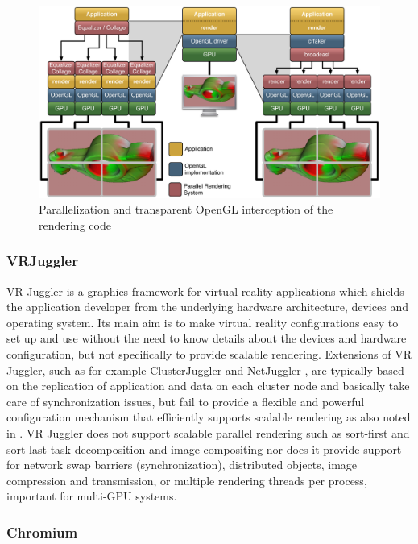 \begin{figure}[h!t]
 \includegraphics[width=\textwidth]{images/chromiumVsEq}
 \caption{Parallelization and transparent OpenGL interception of the rendering code\label{fChromium}}
\end{figure}

\subsubsection{VRJuggler}

VR Juggler \cite{BJHMBC:01,JBBC:98} is a graphics framework for virtual reality
applications which shields the application developer from the underlying
hardware architecture, devices and operating system. Its main aim is to make
virtual reality configurations easy to set up and use without the need to know
details about the devices and hardware configuration, but not specifically to
provide scalable rendering. Extensions of VR Juggler, such as for example
ClusterJuggler \cite{BC:03} and NetJuggler \cite{AGLMR:02}, are typically based
on the replication of application and data on each cluster node and basically
take care of synchronization issues, but fail to provide a flexible and
powerful configuration mechanism that efficiently supports scalable rendering
as also noted in \cite{SWNH:03}. VR Juggler does not support scalable parallel
rendering such as sort-first and sort-last task decomposition and image
compositing nor does it provide support for network swap barriers
(synchronization), distributed objects, image compression and transmission, or
multiple rendering threads per process, important for multi-GPU systems.

\subsubsection{Chromium}

